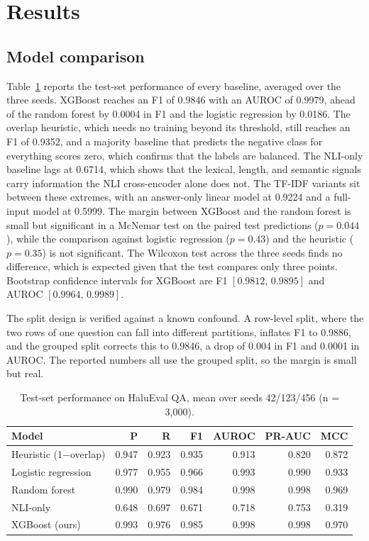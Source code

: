 \section{Results}

\subsection{Model comparison}

Table~\ref{tab:models} reports the test-set performance of every baseline, averaged over the three seeds. XGBoost reaches an F1 of 0.9846 with an AUROC of 0.9979, ahead of the random forest by 0.0004 in F1 and the logistic regression by 0.0186. The overlap heuristic, which needs no training beyond its threshold, still reaches an F1 of 0.9352, and a majority baseline that predicts the negative class for everything scores zero, which confirms that the labels are balanced. The NLI-only baseline lags at 0.6714, which shows that the lexical, length, and semantic signals carry information the NLI cross-encoder alone does not. The TF-IDF variants sit between these extremes, with an answer-only linear model at 0.9224 and a full-input model at 0.5999. The margin between XGBoost and the random forest is small but significant in a McNemar test on the paired test predictions ($p = 0.044$), while the comparison against logistic regression ($p = 0.43$) and the heuristic ($p = 0.35$) is not significant. The Wilcoxon test across the three seeds finds no difference, which is expected given that the test compares only three points. Bootstrap confidence intervals for XGBoost are F1 $[0.9812,\,0.9895]$ and AUROC $[0.9964,\,0.9989]$.

The split design is verified against a known confound. A row-level split, where the two rows of one question can fall into different partitions, inflates F1 to 0.9886, and the grouped split corrects this to 0.9846, a drop of 0.004 in F1 and 0.0001 in AUROC. The reported numbers all use the grouped split, so the margin is small but real.

\begin{table}[t]
\centering
\small
\caption{Test-set performance on HaluEval QA, mean over seeds 42/123/456 (n = 3{,}000).}
\label{tab:models}
\begin{tabular}{@{}lrrrrrr@{}}
\toprule
\textbf{Model} & \textbf{P} & \textbf{R} & \textbf{F1} & \textbf{AUROC} & \textbf{PR-AUC} & \textbf{MCC} \\
\midrule
Heuristic (1$-$overlap) & 0.947 & 0.923 & 0.935 & 0.913 & 0.820 & 0.872 \\
Logistic regression     & 0.977 & 0.955 & 0.966 & 0.993 & 0.990 & 0.933 \\
Random forest           & 0.990 & 0.979 & 0.984 & 0.998 & 0.998 & 0.969 \\
NLI-only                & 0.648 & 0.697 & 0.671 & 0.718 & 0.753 & 0.319 \\
XGBoost (ours)          & 0.993 & 0.976 & 0.985 & 0.998 & 0.998 & 0.970 \\
\bottomrule
\end{tabular}
\end{table}

